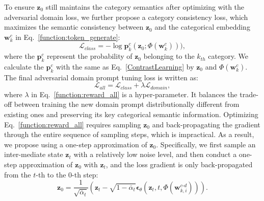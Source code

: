 To ensure $\mathbf{z}_0$ still maintains the category semantics after optimizing with the adversarial domain loss, we further propose a category consistency loss, which maximizes the semantic consistency between $\mathbf{z}_0$ and the categorical embedding $\mathbf{w}_k^c$ in Eq.~\textcolor{red}{\ref{function:token_generate}}: 
\begin{equation}
    \mathcal{L}_{class}=-\log \mathbf{p}_k^c(\mathbf{z}_0; \Phi(\mathbf{w}^c_k))),
    \label{funtion:class_reward}
\end{equation}
where the $\mathbf{p}^c_k$ represent the probability of $\mathbf{z}_0$ belonging to the $k_{th}$ category. We calculate the $\mathbf{p}^c_k$ with the same as Eq.~\textcolor{red}{\ref{ContrastLearning}} by $\mathbf{z}_0$ and $\Phi(\mathbf{w}^c_k)$.
The final adversarial domain prompt tuning loss is written as:
\begin{equation}
    \mathcal{L}_{all}=\mathcal{L}_{class}+\lambda\mathcal{L}_{domain},
    \label{function:reward_all}
\end{equation}  
where $\lambda$ in Eq.~\textcolor{red}{\ref{function:reward_all}} is a hyper-parameter. It balances the trade-off between training the new domain prompt distributionally different from existing ones and preserving its key categorical semantic information.  
Optimizing Eq.~\textcolor{red}{\ref{function:reward_all}} requires sampling $\mathbf{z}_0$ and back-propagating the gradient through the entire sequence of sampling steps, which is impractical. 
As a result, we propose using a one-step approximation of $\mathbf{z}_0$. Specifically, we first sample an inter-mediate state $\mathbf{z}_t$ with a relatively low noise level, and then conduct a one-step approximation of $\mathbf{z}_0$ with $\mathbf{z}_t$, and the loss gradient is only back-propagated from the $t$-th to the $0$-th step:
\begin{equation}
    \mathbf{z}_{0}=\frac{1}{\sqrt{\overline{\alpha}_{t}}}\left(\mathbf{z}_{t}-\sqrt{1-\overline{\alpha}_{t}}\mathbf{\epsilon}_{\theta}\left(\mathbf{z}_{t},t,\Phi\left(\mathbf{w}_{k,i}^{c\text{-} d}\right)\right)\right).
    \label{function:denoising_second}
\end{equation}

